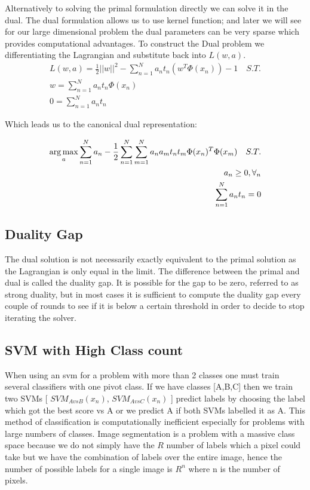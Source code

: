 \par Alternatively to solving the primal formulation directly we can solve it in the dual. The dual formulation allows us to use kernel function; and later we will see for our large dimensional problem the dual parameters can be very sparse which provides computational advantages. To construct the Dual problem we differentiating the Lagrangian and substitute back into $L(w,a)$.
  \begin{align}
L(w,a) = \frac{1}{2}||w||^2 - \sum^{N}_{n=1} a_n { t_n ( w^T \Phi(x_n)) -1 }  \quad  S.T. \\
 w =\sum^{N}_{n=1} a_n t_n \Phi(x_n) \\ 
 0=\sum^{N}_{n=1} a_n t_n 
  \end{align}
  
  Which leads us to the canonical dual representation:
  
  \begin{align}
 \operatorname*{arg\,max}_a \sum^N_{n=1} a_n -\frac{1}{2} \sum^{N}_{n=1} \sum^{N}_{m=1} a_n a_m t_n t_m \Phi(x_n)^T\Phi(x_m)  \quad  S.T. \label{eq:dualsvm}\\
 a_n \geq 0, \forall_n\\
 \sum^{N}_{n=1} a_n t_n =0
  \end{align}
  
\subsection{Duality Gap}
\par The dual solution is not necessarily exactly equivalent to the primal solution as the Lagrangian is only equal in the limit. The difference between the primal and dual is called the duality gap. It is possible for the gap to be zero, referred to as strong duality, but in most cases it is sufficient to compute the duality gap every couple of rounds to see if it is below a certain threshold in order to decide to stop iterating the solver. 
\subsection{SVM with High Class count}
When using an svm for a problem with more than 2 classes one must train several classifiers with one pivot class. If we have classes [A,B,C] then we train two SVMs [ $SVM_{A vs B}(x_n)$,  $SVM_{A vs C}(x_n)$ ] predict labels by choosing the label which got the best score vs A or we predict A if both SVMs labelled it as A. This method of classification is computationally inefficient especially for problems with large numbers of classes. Image segmentation is a problem with a massive class space because we do not simply have the $R$ number of labels which a pixel could take but we have the combination of labels over the entire image, hence the number of possible labels for a single image is $R^n$ where n is the number of pixels. 

